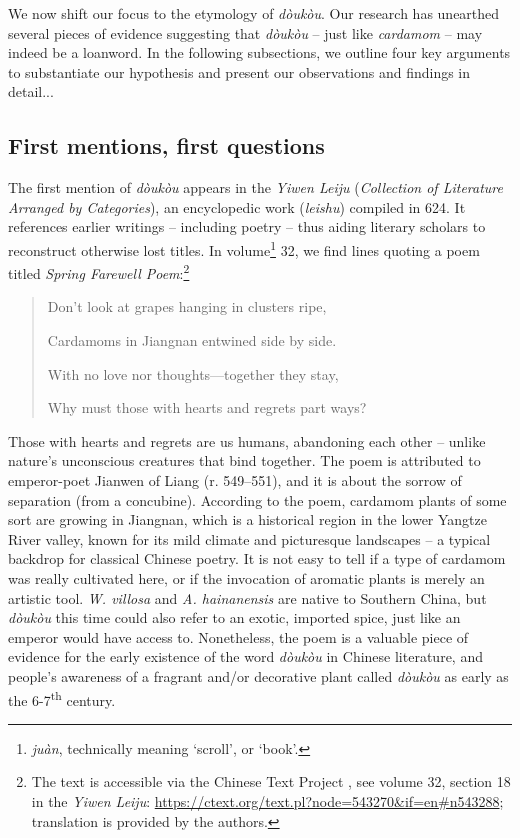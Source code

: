 \documentclass[12pt]{article}
\newcommand{\tc}[1]{\traditionalchinesefont{#1}\rmfamily}
\begin{document}
We now shift our focus to the etymology of \textit{dòukòu}. Our research has unearthed several pieces of evidence suggesting that \textit{dòukòu} -- just like \textit{cardamom} -- may indeed be a loanword. In the following subsections, we outline four key arguments to substantiate our hypothesis and present our observations and findings in detail...

\subsection{First mentions, first questions}


The first mention of \tc{荳蔻} \textit{dòukòu} appears in the \tc{藝文類聚} \textit{Yiwen Leiju} (\textit{Collection of Literature Arranged by Categories}), an encyclopedic work (\textit{leishu}) compiled in 624. It references earlier writings -- including poetry -- thus aiding literary scholars to reconstruct otherwise lost titles. In volume\footnote{\tc{卷} \textit{juàn}, technically meaning `scroll', or `book'.} 32, we find lines quoting a poem titled \tc{春別詩} \textit{Spring Farewell Poem}:\footnote{The text is accessible via the Chinese Text Project \parencite{sturgeon_2021_chinese}, see volume 32, section 18 in the \textit{Yiwen Leiju}: \url{https://ctext.org/text.pl?node=543270\&if=en\#n543288}; translation is provided by the authors.}

\begin{quote}

\tc{別觀蒲萄帶實垂，} Don't look at grapes hanging in clusters ripe,

\tc{江南\textcolor{accent}{荳蔻}生連枝，} Cardamoms in Jiangnan entwined side by side.

\tc{無情無意又如此，} With no love nor thoughts---together they stay,

\tc{有心有恨徒別離。} Why must those with hearts and regrets part ways?

\end{quote}

Those with hearts and regrets are us humans, abandoning each other -- unlike nature's unconscious creatures that bind together. The poem is attributed to emperor-poet Jianwen of Liang (r. 549--551), and it is about the sorrow of separation (from a concubine). According to the poem, cardamom plants of some sort are growing in Jiangnan, which is a historical region in the lower Yangtze River valley, known for its mild climate and picturesque landscapes -- a typical backdrop for classical Chinese poetry. It is not easy to tell if a type of cardamom was really cultivated here, or if the invocation of aromatic plants is merely an artistic tool. \textit{W. villosa} and \textit{A. hainanensis} are native to Southern China, but \textit{dòukòu} this time could also refer to an exotic, imported spice, just like an emperor would have access to. Nonetheless, the poem is a valuable piece of evidence for the early existence of the word \textit{dòukòu} in Chinese literature, and people's awareness of a fragrant and/or decorative  plant called \textit{dòukòu} as early as the 6-7\textsuperscript{th} century.
\end{document}
